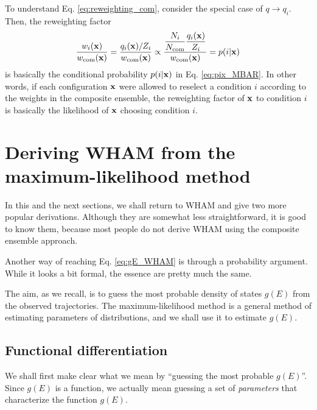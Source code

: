 \documentclass[aip,jcp,preprint,superscriptaddress]{revtex4-1}
\begin{document}
To understand Eq. \eqref{eq:reweighting_com},
consider the special case of $q \rightarrow q_i$.
%
Then, the reweighting factor
\begin{align*}
  \frac{ w_i(\mathbf{x}) } { w_{\mathrm{com}}(\mathbf{x}) }
=
  \frac{  q_i(\mathbf{x}) / Z_i }
  { w_{\mathrm{com}}(\mathbf{x}) }
\propto
\frac{ \dfrac{N_i}{N_{\mathrm{com}}} \dfrac{ q_i(\mathbf{x}) }{ Z_i } }
  { w_{\mathrm{com}}(\mathbf{x}) }
= p(i|\mathbf{x})
\end{align*}
is basically
the conditional probability $p(i|\mathbf{x})$
in Eq. \eqref{eq:pix_MBAR}.
%
In other words,
if each configuration $\mathbf{x}$
were allowed to reselect a condition $i$
according to the weights in the composite ensemble,
the reweighting factor of $\mathbf{x}$
to condition $i$
is basically the likelihood
of $\mathbf{x}$ choosing condition $i$.






\section{\label{sec:WHAM_maxlikelihood}
Deriving WHAM from the maximum-likelihood method}



In this and the next sections,
we shall return to WHAM
and give two more popular derivations.
%
Although they are somewhat less straightforward,
it is good to know them,
because most people do not derive WHAM
using the composite ensemble approach.



Another way of reaching Eq. \eqref{eq:gE_WHAM}
is through a probability argument\cite{
bartels1997, *gallicchio2005, *habeck2007, *habeck2012, zhu2012}.
%
While it looks a bit formal,
the essence are pretty much the same.



The aim, as we recall, is to guess the most probable
density of states $g(E)$ from the observed trajectories.
%
The maximum-likelihood method is a general method of
estimating parameters of distributions,
and we shall use it to estimate $g(E)$.



\subsection{Functional differentiation}



We shall first make clear
what we mean by ``guessing the most probable $g(E)$''.
%
Since $g(E)$ is a function,
we actually mean guessing a set of \emph{parameters}
that characterize the function $g(E)$.
%
\end{document}
